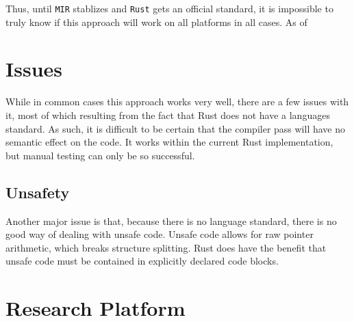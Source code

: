 \documentclass[12pt,oneside]{book}
\newcommand{\rustname}{{\texttt{Rust}}}
\def \rust {\rustname{}\xspace}
\newcommand{\mirname}{{\texttt{MIR}}}
\def \mir {\mirname{}\xspace}
\begin{document}
Thus, until \mir stablizes and \rust gets an official standard, it is impossible
to truly know if this approach will work on all platforms in all cases. As of 

\chapter{Issues}

While in common cases this approach works very well, there are a few issues with
it, most of which resulting from the fact that Rust does not have a languages
standard. As such, it is difficult to be certain that the compiler pass will
have no semantic effect on the code. It works within the current Rust
implementation, but manual testing can only be so successful.


\section{Unsafety}
\label{sec:unsafe}


Another major issue is that, because there is no language standard, there is no
good way of dealing with unsafe code. Unsafe code allows for raw pointer
arithmetic, which breaks structure splitting. Rust does have the benefit that
unsafe code must be contained in explicitly declared code blocks.

\chapter{Research Platform}





\end{document}
